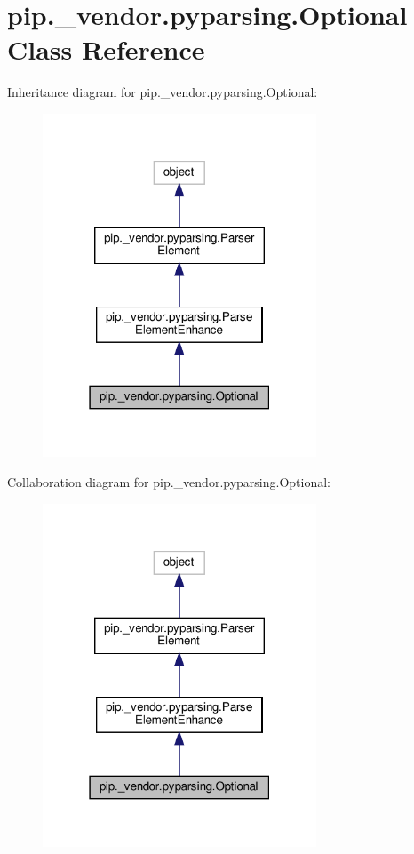 \hypertarget{classpip_1_1__vendor_1_1pyparsing_1_1Optional}{}\section{pip.\+\_\+vendor.\+pyparsing.\+Optional Class Reference}
\label{classpip_1_1__vendor_1_1pyparsing_1_1Optional}


Inheritance diagram for pip.\+\_\+vendor.\+pyparsing.\+Optional\+:
\nopagebreak
\begin{figure}[H]
\begin{center}
\leavevmode
\includegraphics[width=231pt]{classpip_1_1__vendor_1_1pyparsing_1_1Optional__inherit__graph}
\end{center}
\end{figure}


Collaboration diagram for pip.\+\_\+vendor.\+pyparsing.\+Optional\+:
\nopagebreak
\begin{figure}[H]
\begin{center}
\leavevmode
\includegraphics[width=231pt]{classpip_1_1__vendor_1_1pyparsing_1_1Optional__coll__graph}
\end{center}
\end{figure}
